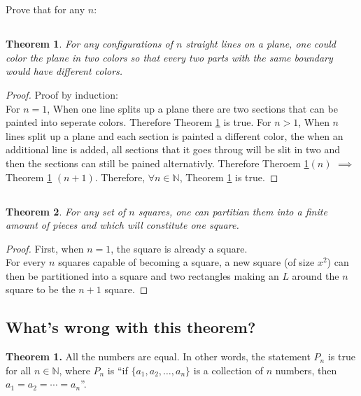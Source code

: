 \documentclass[]{article}
\newcommand{\N}{\mathbb{N}}
\newtheorem{theorem}{Theorem}
\begin{document}
\newpage
\section{}
Prove that for any $n$:
\subsection{}
\begin{theorem}\label{thm:n_lines}
    For any configurations of $n$ straight lines on a plane, one could 
    color the plane in two colors so that every two parts with the same boundary 
    would have different colors.
\end{theorem}
\begin{proof}
    Proof by induction:\\
    For $n=1$,
    When one line splits up a plane there are two sections that 
    can be painted into seperate colors. Therefore Theorem \ref{thm:n_lines} is true.
    For $n>1$,
    When $n$ lines split up a plane and each section is painted a different color, 
    the when an additional line is added, all sections that it goes throug will be 
    slit in two and then the sections can still be pained alternativly.
    Therefore Theroem \ref{thm:n_lines}$(n)$ $\implies$ Theorem \ref{thm:n_lines} $(n+1)$.
    Therefore, $\forall n \in \N$, Theorem \ref{thm:n_lines} is true.
\end{proof}

\subsection{}
\begin{theorem}
    For any set of $n$ squares, one can partitian them into a finite amount of pieces 
    and which will constitute one square.
\end{theorem}
\begin{proof}
    First, when $n=1$, the square is already a square.\\
    For every $n$ squares capable of becoming a square, 
    a new square (of size $x^2$) can then be partitioned into a square and two 
    rectangles making an $L$ around the $n$ square to be the $n+1$ square.
\end{proof}

\subsection{What's wrong with this theorem?}
\textbf{Theorem 1.} All the numbers are equal. In other words, 
the statement $P_n$ is true for all $n\in \N$, where $P_n$ is 
``if $\{a_1,a_2,\dots,a_n\}$ is a collection of $n$ numbers, 
then $a_1 = a_2 = \cdots = a_n$''.\\
\end{document}
